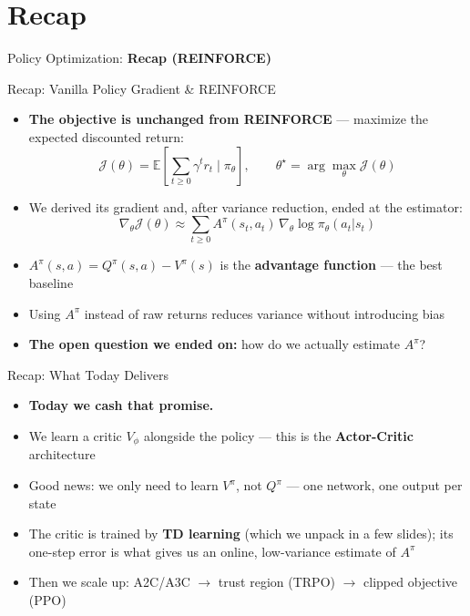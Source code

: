 \section{Recap}
\begin{frame}{}
    \LARGE Policy Optimization: \textbf{Recap (REINFORCE)}
\end{frame}

\begin{frame}{Recap: Vanilla Policy Gradient \& REINFORCE}
\begin{itemize}
    \item \textbf{The objective is unchanged from REINFORCE} --- maximize the expected discounted return:
    $$\mathcal{J}(\theta) = \mathbb{E} \left [ \sum_{t \geq 0} \gamma^t r_t \mid \pi_\theta \right ], \qquad \theta^{\star} = \arg\max_\theta \mathcal{J}(\theta)$$
    \item We derived its gradient and, after variance reduction, ended at the estimator:
    $$\nabla_\theta \mathcal{J}(\theta) \approx \sum_{t \geq 0} A^{\pi}(s_t, a_t)\, \nabla_\theta \log \pi_\theta(a_t|s_t)$$
    \item $A^{\pi}(s,a) = Q^{\pi}(s,a) - V^{\pi}(s)$ is the \textbf{advantage function} --- the best baseline
    \item Using $A^{\pi}$ instead of raw returns reduces variance without introducing bias
    \item \textbf{The open question we ended on:} how do we actually estimate $A^{\pi}$?
\end{itemize}
\end{frame}

\begin{frame}{Recap: What Today Delivers}
\begin{itemize}
    \item \textbf{Today we cash that promise.}
    \item We learn a critic $V_\phi$ alongside the policy --- this is the \textbf{Actor-Critic} architecture
    \item Good news: we only need to learn $V^{\pi}$, not $Q^{\pi}$ --- one network, one output per state
    \item The critic is trained by \textbf{TD learning} (which we unpack in a few slides); its one-step error is what gives us an online, low-variance estimate of $A^{\pi}$
    \item Then we scale up: A2C/A3C $\rightarrow$ trust region (TRPO) $\rightarrow$ clipped objective (PPO)
\end{itemize}
\end{frame}
